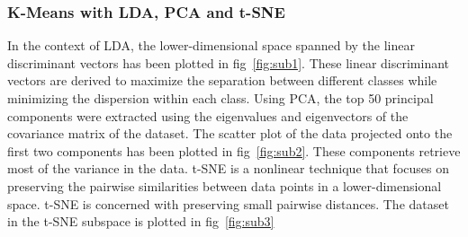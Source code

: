 \documentclass[a4paper]{article}
\theoremstyle{plain}
\theoremstyle{definition}
\begin{document}
{\subsubsection {K-Means with LDA, PCA and t-SNE }
In the context of LDA, the lower-dimensional space spanned by the linear discriminant vectors has been plotted in fig~\ref{fig:sub1}. These linear discriminant vectors are derived to maximize the separation between different classes while minimizing the dispersion within each class.
Using PCA, the top 50 principal components were extracted using the eigenvalues and eigenvectors of the covariance matrix of the dataset. The scatter plot of the data projected onto the first two components has been plotted in fig~\ref{fig:sub2}. These components retrieve most of the variance in the data. 
t-SNE is a nonlinear technique that focuses on preserving the pairwise similarities between data points in a lower-dimensional space. t-SNE is concerned with preserving small pairwise distances. The dataset in the t-SNE subspace is plotted in fig~\ref{fig:sub3} 


}
\end{document}
